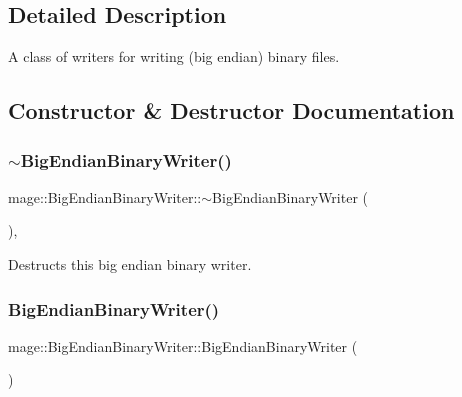\subsection{Detailed Description}
A class of writers for writing (big endian) binary files. 

\subsection{Constructor \& Destructor Documentation}
\hypertarget{classmage_1_1_big_endian_binary_writer_ab717bcbfc15ba4a1cb25eeb564e120b8}{}\label{classmage_1_1_big_endian_binary_writer_ab717bcbfc15ba4a1cb25eeb564e120b8} 
\subsubsection{\texorpdfstring{$\sim$\+Big\+Endian\+Binary\+Writer()}{~BigEndianBinaryWriter()}}
{\footnotesize\ttfamily mage\+::\+Big\+Endian\+Binary\+Writer\+::$\sim$\+Big\+Endian\+Binary\+Writer (\begin{DoxyParamCaption}{ }\end{DoxyParamCaption})\hspace{0.3cm}{\ttfamily [virtual]}, {\ttfamily [default]}}

Destructs this big endian binary writer. \hypertarget{classmage_1_1_big_endian_binary_writer_ac0917b684913834577d4850269a6c09a}{}\label{classmage_1_1_big_endian_binary_writer_ac0917b684913834577d4850269a6c09a} 
\subsubsection{\texorpdfstring{Big\+Endian\+Binary\+Writer()}{BigEndianBinaryWriter()}\hspace{0.1cm}{\footnotesize\ttfamily [1/3]}}
{\footnotesize\ttfamily mage\+::\+Big\+Endian\+Binary\+Writer\+::\+Big\+Endian\+Binary\+Writer (\begin{DoxyParamCaption}{ }\end{DoxyParamCaption})\hspace{0.3cm}{\ttfamily [protected]}}

